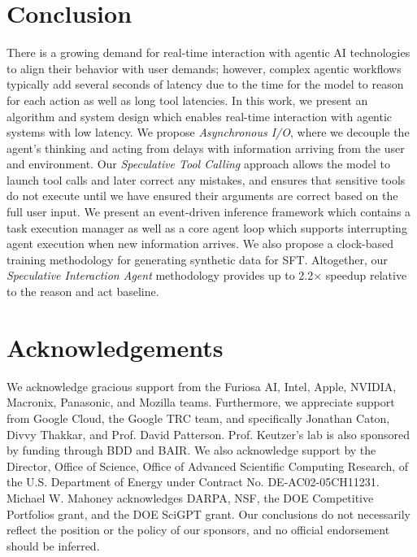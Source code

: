 \section{Conclusion}

There is a growing demand for real-time interaction with agentic AI technologies to align their behavior with user demands; however, complex agentic workflows typically add several seconds of latency due to the time for the model to reason for each action as well as long tool latencies.
In this work, we present an algorithm and system design which enables real-time interaction with agentic systems with low latency.
We propose \textit{Asynchronous I/O}, where we decouple the agent's thinking and acting from delays with information arriving from the user and environment.
Our \textit{Speculative Tool Calling} approach allows the model to launch tool calls and later correct any mistakes, and ensures that sensitive tools do not execute until we have ensured their arguments are correct based on the full user input.
We present an event-driven inference framework which contains a task execution manager as well as a core agent loop which supports interrupting agent execution when new information arrives.
We also propose a clock-based training methodology for generating synthetic data for SFT.
Altogether, our \textit{Speculative Interaction Agent} methodology provides up to 2.2$\times$ speedup relative to the reason and act baseline.


\section{Acknowledgements}

We acknowledge gracious support from the Furiosa AI, Intel, Apple, NVIDIA, Macronix, Panasonic, and Mozilla teams. 
Furthermore, we appreciate support from Google Cloud, the Google TRC team, and specifically Jonathan Caton, Divvy Thakkar, and Prof. David Patterson.
Prof. Keutzer’s lab is also sponsored by funding through BDD and BAIR. 
We also acknowledge support by the Director, Office of Science, Office of Advanced Scientific Computing Research, of the U.S. Department of Energy under
Contract No. DE-AC02-05CH11231. Michael W. Mahoney acknowledges
DARPA, NSF, the DOE Competitive Portfolios grant, and
the DOE SciGPT grant. Our conclusions do not necessarily
reflect the position or the policy of our sponsors, and no
official endorsement should be inferred.